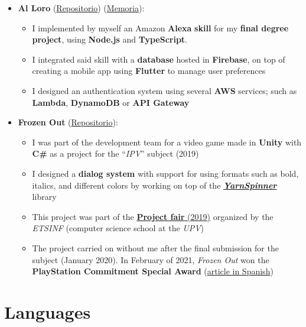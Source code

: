 \documentclass[letterpaper, 12pt, dvipsnames]{article}
\newcommand{\upv}{UPV}
\begin{document}
\begin{itemize}
    \item \textbf{Al Loro} (\href{https://github.com/algono/FeedTheParrot-RSS}{Repositorio}) (\href{http://hdl.handle.net/10251/174256}{Memoria}):
          \begin{itemize}
              \item I implemented by myself an Amazon \textbf{Alexa} \textbf{skill} for my \textbf{final degree project}, using \textbf{Node.js} and \textbf{TypeScript}.
              \item I integrated said skill with a \textbf{database} hosted in \textbf{Firebase}, on top of creating a mobile app using \textbf{Flutter} to manage user preferences
              \item I designed an authentication system using several \textbf{AWS} services; such as \textbf{Lambda}, \textbf{DynamoDB} or \textbf{API Gateway}
          \end{itemize}
    \item \textbf{Frozen Out} (\href{https://github.com/Freezer-Games/Frozen-Out}{Repositorio}):
          \begin{itemize}
              \item I was part of the development team for a video game made in \textbf{Unity} with \textbf{C\#} as a project for the ``\emph{IPV}'' subject (2019)
              \item I designed a \textbf{dialog system} with support for using formats such as bold, italics, and different colors by working on top of the \href{https://yarnspinner.dev/}{\textbf{\emph{YarnSpinner}}} library
              \item This project was part of the \href{https://es-es.facebook.com/etsinf/videos/feria-de-proyectos-de-estudiantes-2019/1921312964681641/}{\textbf{Project fair} (2019)} organized by the \emph{ETSINF} (computer science school at the \emph{\upv})
              \item The project carried on without me after the final submission for the subject (January 2020). In February of 2021, \emph{Frozen Out} won the \textbf{PlayStation Commitment Special Award} (\href{https://www.inf.upv.es/www/etsinf/es/premio-especial-compromiso-playstation-para-el-videojuego-frozen-out-creado-por-estudiantes-de-la-etsinf-y-la-facultat-de-bb-aa/}{article in Spanish})
          \end{itemize}
\end{itemize}

\section*{Languages}
\end{document}
